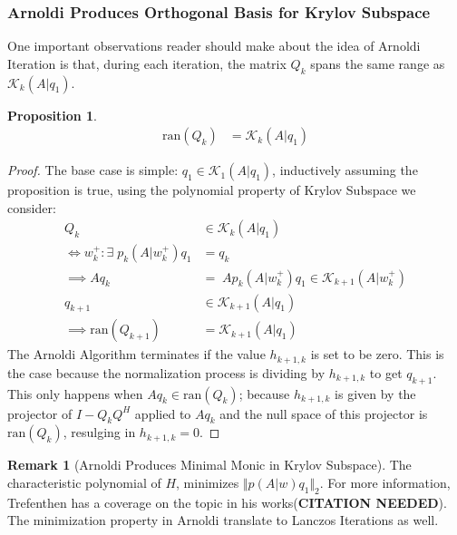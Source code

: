 \documentclass[]{article}
\theoremstyle{definition}
\newtheorem{prop}{Proposition}[section]  %
\newtheorem{remark}{Remark}[subsection]
\begin{document}
        \subsubsection{Arnoldi Produces Orthogonal Basis for Krylov Subspace}
            One important observations reader should make about the idea of Arnoldi Iteration is that, during each iteration, the matrix $Q_k$ spans the same range as $\mathcal K_k(A|q_1)$. 
            \begin{prop}
                \begin{align}
                    \text{ran}(Q_k) &= \mathcal K_k(A|q_1)
                \end{align}
            \end{prop}
            \begin{proof}
                The base case is simple: $q_1 \in \mathcal K_1(A|q_1)$, inductively assuming the proposition is true, using the polynomial property of Krylov Subspace we consider: 
                $$
                \begin{aligned}
                    Q_k &\in \mathcal K_k(A|q_1)
                    \\
                    \iff w_k^+: \exists\; p_k(A|w_k^+)q_1 &= q_k
                    \\
                    \implies Aq_k &= \; Ap_k(A|w_k^+)q_1 \in \mathcal K_{k + 1}(A|w_k^+)
                    \\
                    q_{k + 1} &\in \mathcal K_{k + 1}(A|q_{1})
                    \\
                    \implies \text{ran}(Q_{k + 1}) &= \mathcal K_{k + 1}(A|q_1)
                \end{aligned}
                $$
                The Arnoldi Algorithm terminates if the value $h_{k + 1, k}$ is set to be zero. This is the case because the normalization process is dividing by $h_{k + 1, k}$ to get $q_{k + 1}$. This only happens when $Aq_{k}\in \text{ran}(Q_k)$; because $h_{k +1, k}$ is given by the projector of $I - Q_kQ^H$ applied to $Aq_k$ and the null space of this projector is $\text{ran}(Q_k)$, resulging in $h_{k + 1, k} = 0$. 
            \end{proof}
            \begin{remark}[Arnoldi Produces Minimal Monic in Krylov Subspace]\label{remark:Arnoldi_Produces_Minimal_Monic_in_Krylov_Subspace}
                The characteristic polynomial of $H$, minimizes $\Vert p(A|w)q_1\Vert_2$. For more information, Trefenthen has a coverage on the topic in his works(\textbf{CITATION NEEDED}). The minimization property in Arnoldi translate to Lanczos Iterations as well. 
            \end{remark}
\end{document}
